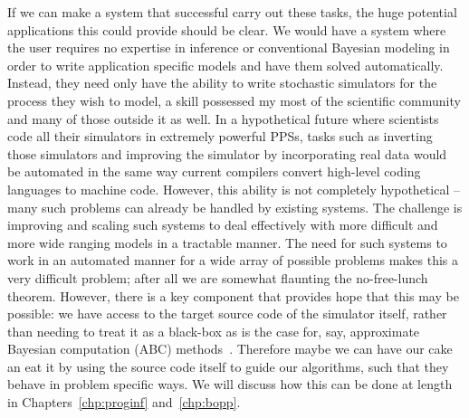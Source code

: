 If we can make a system that successful carry out these tasks, 
the huge potential applications this could provide should be clear. We would have a 
system where the user requires no expertise in inference or conventional
Bayesian modeling in order to write application specific models and have them solved automatically.
Instead, they need only have the ability to write stochastic simulators for the process they wish to
model, a skill possessed my most of the scientific community and many of those outside it as well.
In a hypothetical future where scientists
code all their simulators in extremely powerful PPSs, tasks such as
inverting those simulators and improving the simulator by incorporating real data would
be automated in the same way current compilers convert high-level coding languages to machine code.  
However, this ability is not completely
hypothetical -- many such problems can already be handled by existing systems.  The challenge
is improving and scaling such systems to deal effectively with more difficult and more wide ranging models
in a tractable manner.  The need for such systems to work in an automated manner for a wide array
of possible problems makes this a very difficult problem; after all we are somewhat flaunting the no-free-lunch
theorem.  However, there is a key component that provides hope that this may be possible: we have access
to the target source code of the simulator itself, rather than needing to treat it as a black-box as is the
case for, say, approximate Bayesian computation (ABC) methods~\citep{csillery2010approximate}.  Therefore
maybe we can have our cake an eat it by using the source code itself to guide our algorithms, such that
they behave in problem specific ways.  We will discuss how this can be done at length in 
Chapters~\ref{chp:proginf} and~\ref{chp:bopp}.